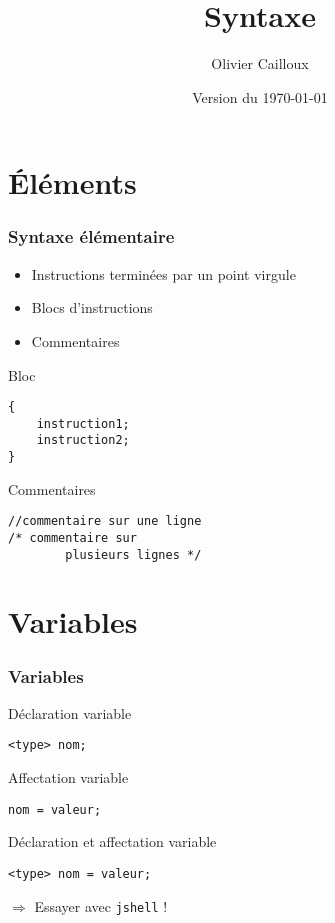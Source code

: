 \documentclass[english, french]{beamer}
\title{Syntaxe}
\author{Olivier Cailloux}
\institute[LAMSADE]{LAMSADE, Université Paris-Dauphine}
\date{Version du \today}
\begin{document}
\begin{frame}[plain]
	\titlepage
\end{frame}
\addtocounter{framenumber}{-1}

\section{Éléments}
\begin{frame}[fragile]
	\frametitle{Syntaxe élémentaire}
	\begin{itemize}
		\item Instructions terminées par un point virgule
		\item Blocs d’instructions
		\item Commentaires
	\end{itemize}
	\begin{block}{Bloc}
		\begin{lstlisting}
{
	instruction1;
	instruction2;
}
		\end{lstlisting}	
	\end{block}
	\begin{block}{Commentaires}
		\begin{lstlisting}
//commentaire sur une ligne
/* commentaire sur 
        plusieurs lignes */
		\end{lstlisting}
	\end{block}
\end{frame}

\section{Variables}
\begin{frame}[fragile]
	\frametitle{Variables}
	\begin{block}{Déclaration variable}
		\begin{lstlisting}
<type> nom;
		\end{lstlisting}	
	\end{block}
	\begin{block}{Affectation variable}
		\begin{lstlisting}
nom = valeur;
		\end{lstlisting}
	\end{block}
	\begin{block}{Déclaration et affectation variable}
		\begin{lstlisting}
<type> nom = valeur;
		\end{lstlisting}	
	\end{block}
	$⇒$ Essayer avec \texttt{jshell} !
\end{frame}
\end{document}
